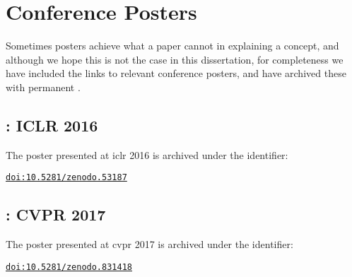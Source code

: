 \documentclass[thesis]{subfiles}
\begin{document}

\chapter{Conference Posters}
\label{posters}
Sometimes posters achieve what a paper cannot in explaining a concept, and although we hope this is not the case in this dissertation, for completeness we have included the links to relevant conference posters, and have archived these with permanent .
\section*{: ICLR 2016}
The poster presented at \gls{iclr} 2016 is archived under the identifier:
\begin{flushright}
    \href{https://doi.org/10.5281/zenodo.53187}{\texttt{doi:10.5281/zenodo.53187}}
\end{flushright}
\section*{: CVPR 2017}
The poster presented at \gls{cvpr} 2017 is archived under the identifier:
\begin{flushright}
    \href{https://doi.org/10.5281/zenodo.831418}{\texttt{doi:10.5281/zenodo.831418}}
\end{flushright}
\end{document}
